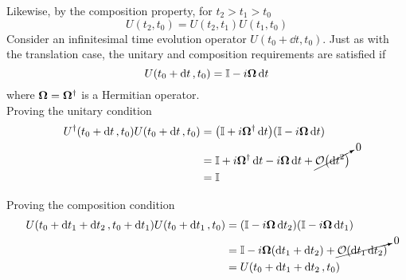\documentclass[12pt,a4paper,titlepage]{article}
\begin{document}
Likewise, by the composition property, for $t_{2}>t_{1}>t_{0}$
\begin{equation}
U(t_{2},t_{0})=U(t_{2},t_{1})U(t_{1},t_{0})
\end{equation}
Consider an infinitesimal time evolution operator $U(t_{0}+\dd{t},t_{0})$. Just as with the translation case, the unitary and composition requirements are satisfied if
\begin{equation}
U(t_{0}+\dd{t},t_{0})=\mathbb{I}-i\vb{\Omega}\dd{t}
\end{equation}
where $\vb{\Omega}=\vb{\Omega}^{\dagger}$ is a Hermitian operator.\\

Proving the unitary condition
\begin{equation}
\begin{aligned}
U^{\dagger}(t_{0}+\dd{t},t_{0})U(t_{0}+\dd{t},t_{0})&=\qty(\mathbb{I}+i\vb{\Omega}^{\dagger}\dd{t})\qty(\mathbb{I}-i\vb{\Omega}\dd{t})\\
&=\mathbb{I}+i\vb{\Omega}^{\dagger}\dd{t}-i\vb{\Omega}\dd{t}+\cancelto{0}{\order{\dd{t}^{2}}}\\
&=\mathbb{I}
\end{aligned}
\end{equation}

Proving the composition condition
\begin{equation}
\begin{aligned}
U(t_{0}+\dd{t_{1}}+\dd{t_{2}},t_{0}+\dd{t_{1}})U(t_{0}+\dd{t_{1}},t_{0})&=\qty(\mathbb{I}-i\vb{\Omega}\dd{t_{2}})\qty(\mathbb{I}-i\vb{\Omega}\dd{t_{1}})\\
&=\mathbb{I}-i\vb{\Omega}(\dd{t_{1}}+\dd{t_{2}})+\cancelto{0}{\order{\dd{t_{1}}\dd{t_{2}}}}\\
&=U(t_{0}+\dd{t_{1}}+\dd{t_{2}},t_{0})
\end{aligned}
\end{equation}
\end{document}
